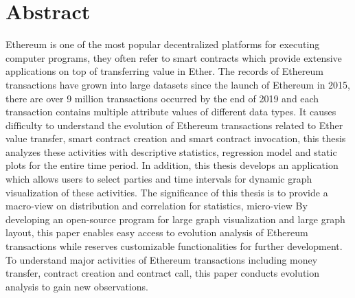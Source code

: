 %
\chapter*{Abstract}
\label{sec:abstract}
\vspace*{-10mm}

Ethereum is one of the most popular decentralized platforms for executing computer programs, they often refer to smart contracts which provide extensive applications on top of transferring value in Ether. The records of Ethereum transactions have grown into large datasets since the launch of Ethereum in 2015, there are over 9 million transactions occurred by the end of 2019 and each transaction contains multiple attribute values of different data types. It causes difficulty to understand the evolution of Ethereum transactions related to Ether value transfer, smart contract creation and smart contract invocation, this thesis analyzes these activities with descriptive statistics, regression model and static plots for the entire time period. In addition, this thesis develops an application which allows users to select parties and time intervals for dynamic graph visualization of these activities. The significance of this thesis is to provide a macro-view on distribution and correlation for statistics, micro-view By developing an open-source program for large graph visualization and large graph layout, this paper enables easy access to evolution analysis of Ethereum transactions while reserves customizable functionalities for further development.  To understand major activities of Ethereum transactions including money transfer, contract creation and contract call, this paper conducts evolution analysis to gain new observations.
